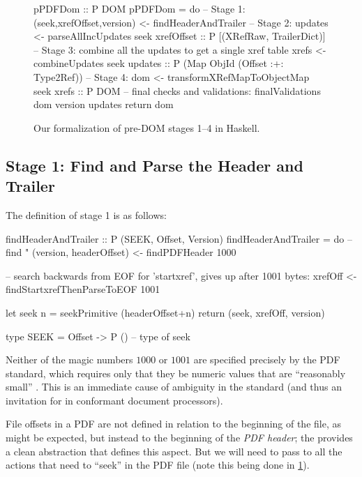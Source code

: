 \begin{figure}[t]
\centering
\lstset{numbers=right}
\begin{code}
pPDFDom :: P DOM
pPDFDom =
    do
    -- Stage 1:
    (seek,xrefOffset,version) <- findHeaderAndTrailer
    -- Stage 2:
    updates <- parseAllIncUpdates seek xrefOffset
               :: P [(XRefRaw, TrailerDict)]
    -- Stage 3: combine all the updates to get a single xref table
    xrefs <- combineUpdates seek updates
             :: P (Map ObjId (Offset :+: Type2Ref))
    -- Stage 4:
    dom <- transformXRefMapToObjectMap seek xrefs
           :: P DOM
    -- final checks and validations:
    finalValidations dom version updates
    return dom
\end{code}
\caption{Our formalization of pre-DOM stages 1--4 in Haskell.}
\label{fig:spec}
\end{figure}


\subsection{Stage 1: Find and Parse the Header and Trailer}
\label{sec:stage-1}

The definition of stage 1 is as follows:
\begin{code}
findHeaderAndTrailer :: P (SEEK, Offset, Version)
findHeaderAndTrailer =
    do
    -- find "%
    (version, headerOffset) <- findPDFHeader 1000

    -- search backwards from EOF for 'startxref', gives up after 1001 bytes:
    xrefOff <- findStartxrefThenParseToEOF 1001
    
    let seek n = seekPrimitive (headerOffset+n)
    return (seek, xrefOff, version)
    
type SEEK = Offset -> P () -- type of seek
\end{code}

Neither of the magic numbers $1000$ or $1001$ are specified precisely
by the PDF standard, which requires only that they be numeric values
that are ``reasonably small'' .
%
This is an immediate cause of ambiguity in the standard (and thus an
invitation for \pd{} in conformant document processors).

File offsets in a PDF are not defined in relation to the beginning of
the file, as might be expected, but instead to the beginning of the
\emph{PDF header};
%
the  provides a clean abstraction that defines this
aspect.
%
But we will need to pass  to all the actions that need to
``seek'' in the PDF file (note this being done in \cref{fig:spec}).

